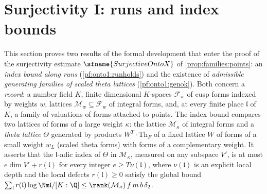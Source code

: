 \section{Surjectivity I: runs and index bounds}\label{sec:pf:onto1}

\providecommand{\ontooneidx}{\operatorname{idx}}
\providecommand{\ontooneql}{\operatorname{ql}}
\providecommand{\ontoonesize}{\operatorname{size}}
\providecommand{\ontoonemls}{\operatorname{mls}}
\providecommand{\ontooneMsup}{M^{\mathrm{sup}}}
\providecommand{\ontoonePt}{\operatorname{Pt}}
\providecommand{\ontooneDF}{\operatorname{DF}}
\providecommand{\ontoonedepth}{\operatorname{depth}}
\providecommand{\ontoonerk}{\operatorname{rk}}
\providecommand{\ontooneord}{\operatorname{ord}}
\providecommand{\ontoonelg}{\operatorname{lg}}
\providecommand{\ontoonePP}{\mathsf{P}}
\providecommand{\ontoonePPz}{\mathsf{P}_0}
\providecommand{\ontoonebin}{\binom{T-1}{\delta}}
\providecommand{\ontooneIB}{\mathrm{IB}}
\providecommand{\ontooneet}{\eta}

This section proves two results of the formal development \cite{LeanSource2026} that enter the
proof of the surjectivity estimate $\sfname{SurjectiveOntoX}$ of \cref{prop:families:points}: an
\emph{index bound along runs} (\cref{pf:onto1:runholds}) and the existence of \emph{admissible generating
families of scaled theta lattices} (\cref{pf:onto1:genok}). Both concern a \emph{record}: a number field $K$, finite
dimensional $K$-spaces $\mathcal F_w$ of cusp forms indexed by weights $w$, lattices $\mathcal M_w\subseteq\mathcal
F_w$ of integral forms, and, at every finite place $\mathfrak l$ of $K$, a family of valuations of forms
attached to points. The index bound compares two lattices of forms of a large weight $\kappa$: the
lattice $\mathcal M_\kappa$ of integral forms and a \emph{theta lattice} $\Theta$ generated by products
$W^T\cdot\mathrm{Th}_F$ of a fixed lattice $W$ of forms of a small weight $w_L$ (scaled theta forms) with forms
of a complementary weight. It asserts that the $\mathfrak l$-adic index of $\Theta$ in $\mathcal M_\kappa$,
measured on any subspace $V'$, is at most $e\dim V'+r(\mathfrak l)$ for every integer $e\ge T\nu(\mathfrak l)$,
where $\nu(\mathfrak l)$ is an explicit local depth and the local defects $r(\mathfrak l)\ge0$ satisfy the
global bound $\sum_{\mathfrak l}r(\mathfrak l)\log\Nm\mathfrak l/[K:\Q]\le\rank(\mathcal M_\kappa)\,f\,m\,b\,\delta_2$.

